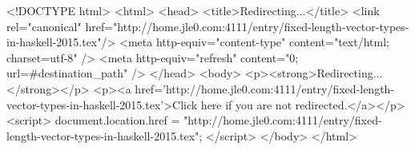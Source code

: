<!DOCTYPE html>
<html>
<head>
<title>Redirecting...</title>
<link rel="canonical" href="http://home.jle0.com:4111/entry/fixed-length-vector-types-in-haskell-2015.tex"/>
<meta http-equiv="content-type" content="text/html; charset=utf-8" />
<meta http-equiv="refresh" content="0; url=#{destination_path}" />
</head>
<body>
  <p><strong>Redirecting...</strong></p>
  <p><a href='http://home.jle0.com:4111/entry/fixed-length-vector-types-in-haskell-2015.tex'>Click here if you are not redirected.</a></p>
  <script>
    document.location.href = "http://home.jle0.com:4111/entry/fixed-length-vector-types-in-haskell-2015.tex";
  </script>
</body>
</html>
